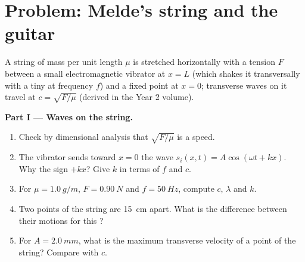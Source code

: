 \section{Problem: Melde's string and the guitar}

\begin{problem}
\label{pb:b1:wave-propagation:1}
A string of mass per unit length $\mu$ is stretched horizontally with a
tension $F$ between a small electromagnetic vibrator at $x = L$ (which
shakes it transversally with a tiny  at frequency $f$) and a
fixed point at $x = 0$; transverse waves on it travel at
$c = \sqrt{F/\mu}$ (derived in the Year 2 volume).

\medskip
\noindent\textbf{Part I --- Waves on the string.}
\begin{enumerate}
  \item Check by dimensional analysis that $\sqrt{F/\mu}$ is a speed.
  \item The vibrator sends toward $x = 0$ the wave
        $s_i(x, t) = A\cos(\omega t + kx)$. Why the sign $+kx$? Give $k$
        in terms of $f$ and $c$.
  \item For $\mu = \qty{1.0}{g/m}$, $F = \qty{0.90}{N}$ and
        $f = \qty{50}{Hz}$, compute $c$, $\lambda$ and $k$.
  \item Two points of the string are \qty{15}{cm} apart. What is the
         difference between their motions for this ?
  \item For $A = \qty{2.0}{mm}$, what is the maximum transverse
        velocity of a point of the string? Compare with $c$.
\end{enumerate}


\end{problem}
